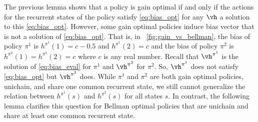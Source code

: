 The previous lemma shows that a policy is gain optimal if and only if the actions for the recurrent states of the policy satisfy \eqref{eq:bias_opt} for any $\vh$ a solution to this \eqref{eq:bias_opt}.
However, some gain optimal policies induce bias vector that is not a solution of \eqref{eq:bias_opt}.
That is, in \figurename~\ref{fig:gain_vs_bellman}, the bias of policy $\pi^1$ is $h^{\pi^1}(1)=c-0.5$ and $h^{\pi^1}(2)=c$ and the bias of policy $\pi^2$ is $h^{\pi^2}(1)=h^{\pi^2}(2)=c$ where $c$ is any real number.
Recall that $\vh^{\pi^1}$ is the solution of \eqref{eq:bias_eval} for $\pi^1$ and $\vh^{\pi^2}$ for $\pi^2$.
So, $\vh^{\pi^1}$ does not satisfy \eqref{eq:bias_opt} but $\vh^{\pi^2}$ does.
While $\pi^1$ and $\pi^2$ are both gain optimal policies, unichain, and share one common recurrent state, we still cannot generalize the relation between $h^{\pi^1}(s)$ and $h^{\pi^2}(s)$ for all states $s$.
In contrast, the following lemma clarifies this question for Bellman optimal policies that are unichain and share at least one common recurrent state.

